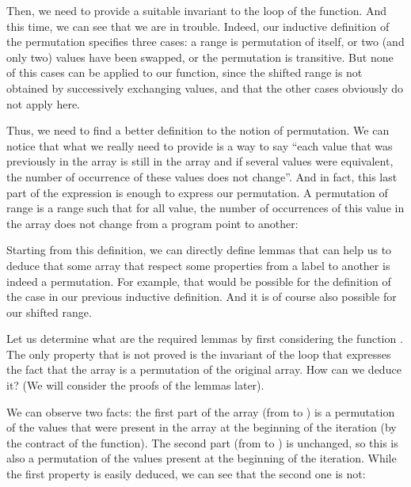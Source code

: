 


Then, we need to provide a suitable invariant to the loop of the
 function. And this time, we can see that we are in trouble.
Indeed, our inductive definition of the permutation specifies three cases: a
range is permutation of itself, or two (and only two) values have been swapped,
or the permutation is transitive. But none of this cases can be applied to our 
 function, since the shifted range is not obtained by
successively exchanging values, and that the other cases obviously do not apply
here.



Thus, we need to find a better definition to the notion of permutation. We can
notice that what we really need to provide is a way to say ``each value that
was previously in the array is still in the array and if several values were
equivalent, the number of occurrence of these values does not change''. And in
fact, this last part of the expression is enough to express our permutation.
A permutation of range is a range such that for all value, the number of
occurrences of this value in the array does not change from a program point to
another:






Starting from this definition, we can directly define lemmas that can help us
to deduce that some array that respect some properties from a label to another
is indeed a permutation. For example, that would be possible for the definition
of the case  in our previous inductive definition. And it is
of course also possible for our shifted range.




Let us determine what are the required lemmas by first considering the function
. The only property that is not proved is the invariant
of the loop that expresses the fact that the array is a permutation of the
original array. How can we deduce it? (We will consider the proofs of the lemmas
later).




We can observe two facts: the first part of the array (from  to
) is a permutation of the values that were present in the array
at the beginning of the iteration (by the contract of the 
function). The second part (from  to ) is
unchanged, so this is also a permutation of the values present at the beginning
of the iteration. While the first property is easily deduced, we can see that
the second one is not:



